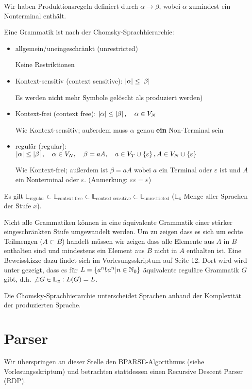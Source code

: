 Wir haben Produktionsregeln definiert durch $\alpha \to \beta$, wobei
$\alpha$ zumindest ein Nonterminal enthält.
\begin{defn}
Eine Grammatik ist nach der Chomsky-Sprachhierarchie:
\begin{itemize}
\item allgemein/uneingeschränkt (unrestricted)

Keine Restriktionen
\item Kontext-sensitiv (context sensitive): $\left\lvert{\alpha}\right\rvert \leq \left\lvert{\beta}\right\rvert$

Es werden nicht mehr Symbole gelöscht als produziert werden)
\item Kontext-frei (context free): $\left\lvert{\alpha}\right\rvert \leq \left\lvert{\beta}\right\rvert, \quad \alpha \in V_N$

Wie Kontext-sensitiv; außerdem muss $\alpha$ genau \textbf{ein} Non-Terminal sein
\item regulär (regular): $\left\lvert{\alpha}\right\rvert \leq \left\lvert{\beta}\right\rvert, \quad \alpha \in V_N, \quad \beta=aA, \quad a \in V_T \cup \left\{\varepsilon\right\}, A \in V_N \cup \left\{\varepsilon\right\}$

Wie Kontext-frei; außerdem ist $\beta=aA$ wobei $a$ ein Terminal oder $\varepsilon$ ist und $A$ ein Nonterminal oder $\varepsilon$. (Anmerkung: $\varepsilon\varepsilon=\varepsilon$)
\end{itemize}
Es gilt $\mathbb{L}_{\text{regular}} \subset \mathbb{L}_{\text{context free}} \subset \mathbb{L}_{\text{context sensitive}} \subset \mathbb{L}_{\text{unrestricted}}$ ($\mathbb{L}_{\text{x}}$ Menge aller Sprachen der Stufe $x$).
\end{defn}

Nicht alle Grammatiken können in eine äquivalente Grammatik einer stärker eingeschränkten Stufe umgewandelt werden. Um zu zeigen dass es sich um echte Teilmengen ($A \subset B$) handelt müssen wir zeigen dass alle Elemente aus $A$ in $B$ enthalten sind und mindestens ein Element aus $B$ nicht in $A$ enthalten ist.
Eine Beweisskizze dazu findet sich im Vorlesungsskriptum auf Seite 12. Dort wird wird unter gezeigt, dass es für $L=\left\{a^n b a^n|n \in \mathbb{N}_0\right\}$ äquivalente reguläre Grammatik $G$ gibt, d.h. $\not \exists G \in \mathbb{L}_{\text{x}} : L(G) = L$.

Die Chomsky-Sprachhierarchie unterscheidet Sprachen anhand der Komplexität der produzierten Sprache.

\section{Parser}\label{subsec:parser}
Wir überspringen an dieser Stelle den BPARSE-Algorithmus (siehe Vorlesungsskriptum) und betrachten stattdessen
einen Recursive Descent Parser (RDP).

